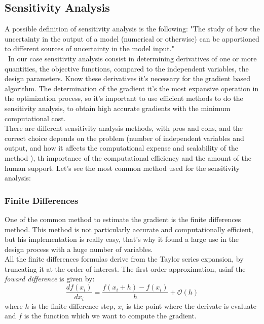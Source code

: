 \subsection{Sensitivity Analysis}
A possible definition of sensitivity analysis is the following: "The study of how the uncertainty in the output of a model (numerical or otherwise) can be apportioned to different sources of uncertainty in the model input."\cite{salt}\\\
In our case sensitivity analysis consist in determining derivatives of one or more quantities, the objective functions, compared to the independent variables, the design parameters. Know these derivatives it's necessary for the gradient based algorithm. The determination of the gradient it's the most expansive operation in the optimization process, so it's important to use efficient methods to do the sensitivity analysis, to obtain high accurate gradients with the minimum computational cost.\\
There are different sensitivity analysis methods, with pros and cons, and the correct choice depends on the problem (number of independent variables and output, and how it affects the computational expense and scalability of the method ), th importance of the computational efficiency and the amount of the human support.
Let's see the most common method used for the sensitivity analysis:
\subsubsection{Finite Differences}
One of the common method to estimate the gradient is the finite differences method. This method is not particularly accurate and computationally efficient, but his implementation is  really easy, that's why it found a large use in the design process with a huge number of variables.\\
All the finite differences formulas derive from the Taylor series expansion, by truncating it at the order of interest. The first order approximation, usinf the \textit{foward difference} is given by:
\begin{equation*}
\frac{df(x_i)}{dx_i}= \frac{f(x_i + h ) - f(x_i	)}{h}+\mathcal{O}(h)
\end{equation*}
where $h$ is the finite difference step, $x_i$ is the point where the derivate is evaluate and $f$ is the function which we want to compute the gradient.
